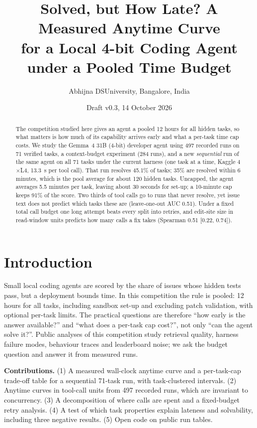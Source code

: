 \documentclass[10pt,twocolumn]{article}
\title{Solved, but How Late? A Measured Anytime Curve\\for a Local 4-bit Coding Agent under a Pooled Time Budget}
\author{Abhijna DS\PES University, Bangalore, India}
\date{Draft v0.3, 14 October 2026}
\begin{document}
\maketitle
\begin{abstract}
\noindent
The competition studied here gives an agent a pooled 12 hours for all hidden tasks, so what matters is how much of its capability arrives early and what a per-task time cap costs. We study the Gemma~4 31B (4-bit) developer agent using 497 recorded runs on 71 verified tasks, a context-budget experiment (284 runs), and a new \emph{sequential} run of the same agent on all 71 tasks under the current harness (one task at a time, Kaggle 4$\times$L4, 13.3~s per tool call). That run resolves 45.1\% of tasks; 35\% are resolved within 6 minutes, which is the pool average for about 120 hidden tasks. Uncapped, the agent averages 5.5 minutes per task, leaving about 30 seconds for set-up; a 10-minute cap keeps 91\% of the score. Two thirds of tool calls go to runs that never resolve, yet issue text does not predict which tasks these are (leave-one-out AUC 0.51). Under a fixed total call budget one long attempt beats every split into retries, and edit-site size in read-window units predicts how many calls a fix takes (Spearman 0.51 [0.22, 0.74]).
\end{abstract}

\section{Introduction}
Small local coding agents are scored by the share of issues whose hidden tests pass, but a deployment bounds time. In this competition the rule is pooled: 12 hours for all tasks, including sandbox set-up and excluding patch validation, with optional per-task limits. The practical questions are therefore ``how early is the answer available?'' and ``what does a per-task cap cost?'', not only ``can the agent solve it?''. Public analyses of this competition study retrieval quality, harness failure modes, behaviour traces and leaderboard noise; we ask the budget question and answer it from measured runs.

\textbf{Contributions.} (1) A measured wall-clock anytime curve and a per-task-cap trade-off table for a sequential 71-task run, with task-clustered intervals. (2) Anytime curves in tool-call units from 497 recorded runs, which are invariant to concurrency. (3) A decomposition of where calls are spent and a fixed-budget retry analysis. (4) A test of which task properties explain lateness and solvability, including three negative results. (5) Open code on public run tables.
\end{document}
